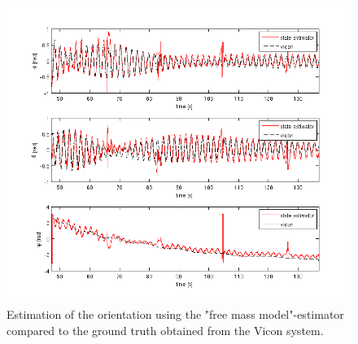 \begin{figure}[hb]
\centering
\includegraphics[width=1\textwidth]{pictures/2_2_fmm_SNR5_orientation_GPS.png}
\caption{Estimation of the orientation using the "free mass model"-estimator compared to the ground truth obtained from the Vicon system.}
\label{orientation_fmm}
\end{figure}

